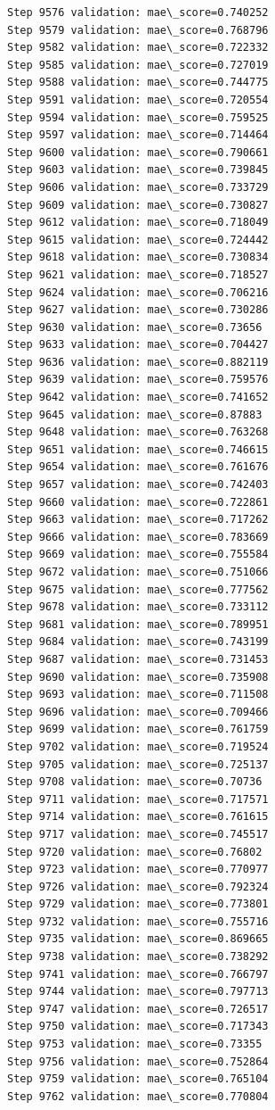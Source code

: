 \documentclass[11pt]{article}
\begin{document}
\begin{Verbatim}[commandchars=\\\{\}]
Step 9576 validation: mae\_score=0.740252
Step 9579 validation: mae\_score=0.768796
Step 9582 validation: mae\_score=0.722332
Step 9585 validation: mae\_score=0.727019
Step 9588 validation: mae\_score=0.744775
Step 9591 validation: mae\_score=0.720554
Step 9594 validation: mae\_score=0.759525
Step 9597 validation: mae\_score=0.714464
Step 9600 validation: mae\_score=0.790661
Step 9603 validation: mae\_score=0.739845
Step 9606 validation: mae\_score=0.733729
Step 9609 validation: mae\_score=0.730827
Step 9612 validation: mae\_score=0.718049
Step 9615 validation: mae\_score=0.724442
Step 9618 validation: mae\_score=0.730834
Step 9621 validation: mae\_score=0.718527
Step 9624 validation: mae\_score=0.706216
Step 9627 validation: mae\_score=0.730286
Step 9630 validation: mae\_score=0.73656
Step 9633 validation: mae\_score=0.704427
Step 9636 validation: mae\_score=0.882119
Step 9639 validation: mae\_score=0.759576
Step 9642 validation: mae\_score=0.741652
Step 9645 validation: mae\_score=0.87883
Step 9648 validation: mae\_score=0.763268
Step 9651 validation: mae\_score=0.746615
Step 9654 validation: mae\_score=0.761676
Step 9657 validation: mae\_score=0.742403
Step 9660 validation: mae\_score=0.722861
Step 9663 validation: mae\_score=0.717262
Step 9666 validation: mae\_score=0.783669
Step 9669 validation: mae\_score=0.755584
Step 9672 validation: mae\_score=0.751066
Step 9675 validation: mae\_score=0.777562
Step 9678 validation: mae\_score=0.733112
Step 9681 validation: mae\_score=0.789951
Step 9684 validation: mae\_score=0.743199
Step 9687 validation: mae\_score=0.731453
Step 9690 validation: mae\_score=0.735908
Step 9693 validation: mae\_score=0.711508
Step 9696 validation: mae\_score=0.709466
Step 9699 validation: mae\_score=0.761759
Step 9702 validation: mae\_score=0.719524
Step 9705 validation: mae\_score=0.725137
Step 9708 validation: mae\_score=0.70736
Step 9711 validation: mae\_score=0.717571
Step 9714 validation: mae\_score=0.761615
Step 9717 validation: mae\_score=0.745517
Step 9720 validation: mae\_score=0.76802
Step 9723 validation: mae\_score=0.770977
Step 9726 validation: mae\_score=0.792324
Step 9729 validation: mae\_score=0.773801
Step 9732 validation: mae\_score=0.755716
Step 9735 validation: mae\_score=0.869665
Step 9738 validation: mae\_score=0.738292
Step 9741 validation: mae\_score=0.766797
Step 9744 validation: mae\_score=0.797713
Step 9747 validation: mae\_score=0.726517
Step 9750 validation: mae\_score=0.717343
Step 9753 validation: mae\_score=0.73355
Step 9756 validation: mae\_score=0.752864
Step 9759 validation: mae\_score=0.765104
Step 9762 validation: mae\_score=0.770804

\end{Verbatim}
\end{document}
